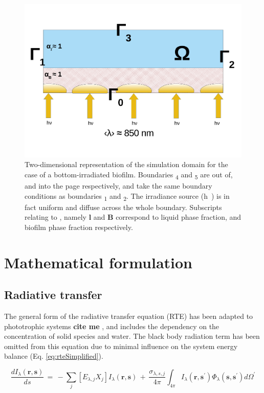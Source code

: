 \begin{figure}[htpb]
    \centering
    \includegraphics[scale=0.5]{Images/Chap4/prob_diagram_below.pdf}
    \caption{Two-dimensional representation of the simulation domain for the case of a bottom-irradiated biofilm. Boundaries \si{\Gamma_4} and \si{\Gamma_5} are out of, and into the page respectively, and take the same boundary conditions as boundaries \si{\Gamma_1} and \si{\Gamma_2}. The irradiance source (\si{h \nu}) is in fact uniform and diffuse across the whole boundary. Subscripts relating to \si{\alpha}, namely \textbf{l} and \textbf{B} correspond to liquid phase fraction, and biofilm phase fraction respectively.} 
    \label{fig:2d_above}
\end{figure}



\newpage
\section{Mathematical formulation}
\label{S:formulation}
\subsection{Radiative transfer}
The general form of the radiative transfer equation (RTE) has been adapted to phototrophic systems \textbf{cite me} \cite{Kong2014}, and includes the dependency on the concentration of solid species and water. The black body radiation term has been omitted from this equation due to minimal influence on the system energy balance (Eq. \ref{eq:rteSimplified}). 

\begin{equation}
\frac{dI_\lambda (\textbf{r}, \textbf{s})}{ds} \, = \, - \sum_{j} [E_{\lambda,j} X_j] I_\lambda (\textbf{r}, \textbf{s})\, +\, \frac{\sigma_{\lambda, s, j}}{4 \pi} \int_{4 \pi} I_\lambda (\textbf{r}, \textbf{s}^\prime) \Phi_\lambda(\textbf{s}, \textbf{s}^\prime) d\Omega^\prime
    \end{equation}

